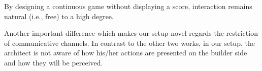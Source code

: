 By designing a continuous game without displaying a score, interaction remains natural (i.e., free) to a high degree. 

Another important difference which makes our setup novel regards the restriction of communicative channels. In contrast to the other two works, in our setup, the architect is not aware of how his/her actions are presented on the builder side and how they will be perceived. %
%

